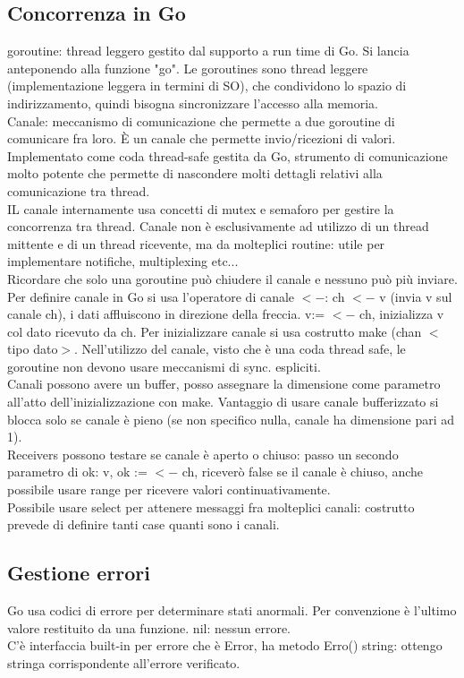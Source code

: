\documentclass{article}
\begin{document}
\subsection{Concorrenza in Go}
goroutine: thread leggero gestito dal supporto a run time di Go. Si lancia anteponendo alla funzione "go". Le goroutines sono thread leggere (implementazione leggera in termini di SO), che condividono lo spazio di indirizzamento, quindi bisogna sincronizzare l'accesso alla memoria.\\ Canale: meccanismo di comunicazione che permette a due goroutine di comunicare fra loro. È un canale che permette invio/ricezioni di valori. Implementato come coda thread-safe gestita da Go, strumento di comunicazione molto potente che permette di nascondere molti dettagli relativi alla comunicazione tra thread.\\ IL canale internamente usa concetti di mutex e semaforo per gestire la concorrenza tra thread. Canale non è esclusivamente ad utilizzo di un thread mittente e di un thread ricevente, ma da molteplici routine: utile per implementare notifiche, multiplexing etc...\\ Ricordare che solo una goroutine può chiudere il canale e nessuno può più inviare. Per definire canale in Go si usa l'operatore di canale $<-$: ch $<-$ v (invia v sul canale ch), i dati affluiscono in direzione della freccia. v:= $<-$ ch, inizializza v col dato ricevuto da ch. Per inizializzare canale si usa costrutto make (chan $<$tipo dato$>$. Nell'utilizzo del canale, visto che è una coda thread safe, le goroutine non devono usare meccanismi di sync. espliciti.\\ Canali possono avere un buffer, posso assegnare la dimensione come parametro all'atto dell'inizializzazione con make. Vantaggio di usare canale bufferizzato si blocca solo se canale è pieno (se non specifico nulla, canale ha dimensione pari ad 1).\\ Receivers possono testare se canale è aperto o chiuso: passo un secondo parametro di ok: v, ok := $<-$ ch, riceverò false se il canale è chiuso, anche possibile usare range per ricevere valori continuativamente.\\ Possibile usare select per attenere messaggi fra molteplici canali: costrutto prevede di definire tanti case quanti sono i canali.
\subsection{Gestione errori}
Go usa codici di errore per determinare stati anormali. Per convenzione è l'ultimo valore restituito da una funzione. nil: nessun errore.\\ C'è interfaccia built-in per errore che è Error, ha metodo Erro() string: ottengo stringa corrispondente all'errore verificato.
\end{document}
